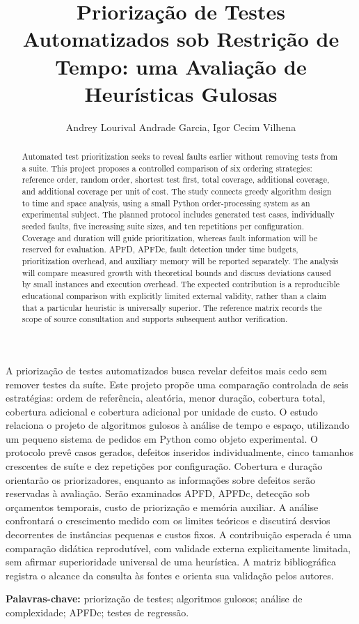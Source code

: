 \documentclass[12pt]{article}
\title{Priorização de Testes Automatizados sob Restrição de Tempo: uma Avaliação de Heurísticas Gulosas}
\author{Andrey Lourival Andrade Garcia\inst{1}, Igor Cecim Vilhena\inst{2}}
\begin{document}
\maketitle
\begin{abstract}
Automated test prioritization seeks to reveal faults earlier without removing tests from a suite. This project proposes a controlled comparison of six ordering strategies: reference order, random order, shortest test first, total coverage, additional coverage, and additional coverage per unit of cost. The study connects greedy algorithm design to time and space analysis, using a small Python order-processing system as an experimental subject. The planned protocol includes generated test cases, individually seeded faults, five increasing suite sizes, and ten repetitions per configuration. Coverage and duration will guide prioritization, whereas fault information will be reserved for evaluation. APFD, APFDc, fault detection under time budgets, prioritization overhead, and auxiliary memory will be reported separately. The analysis will compare measured growth with theoretical bounds and discuss deviations caused by small instances and execution overhead. The expected contribution is a reproducible educational comparison with explicitly limited external validity, rather than a claim that a particular heuristic is universally superior. The reference matrix records the scope of source consultation and supports subsequent author verification.
\end{abstract}
\begin{resumo}
A priorização de testes automatizados busca revelar defeitos mais cedo sem remover testes da suíte. Este projeto propõe uma comparação controlada de seis estratégias: ordem de referência, aleatória, menor duração, cobertura total, cobertura adicional e cobertura adicional por unidade de custo. O estudo relaciona o projeto de algoritmos gulosos à análise de tempo e espaço, utilizando um pequeno sistema de pedidos em Python como objeto experimental. O protocolo prevê casos gerados, defeitos inseridos individualmente, cinco tamanhos crescentes de suíte e dez repetições por configuração. Cobertura e duração orientarão os priorizadores, enquanto as informações sobre defeitos serão reservadas à avaliação. Serão examinados APFD, APFDc, detecção sob orçamentos temporais, custo de priorização e memória auxiliar. A análise confrontará o crescimento medido com os limites teóricos e discutirá desvios decorrentes de instâncias pequenas e custos fixos. A contribuição esperada é uma comparação didática reprodutível, com validade externa explicitamente limitada, sem afirmar superioridade universal de uma heurística. A matriz bibliográfica registra o alcance da consulta às fontes e orienta sua validação pelos autores.
\end{resumo}
\noindent\textbf{Palavras-chave:} priorização de testes; algoritmos gulosos; análise de complexidade; APFDc; testes de regressão.
\end{document}

